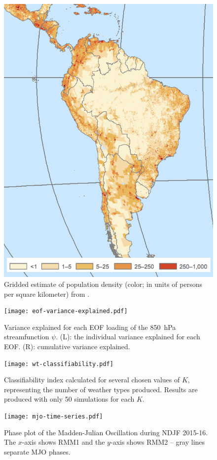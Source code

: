 \documentclass{article}
\begin{document}
\begin{figure}
	\centering
  \includegraphics[width=\textwidth,height=0.6\textheight,keepaspectratio=true]{gpw-v4-2015.png}
	\caption{
		Gridded estimate of population density (color; in units of persons per square kilometer) from \citet{GPWv4}.
	}
\end{figure}

\begin{figure}
  \texttt{[image: eof-variance-explained.pdf]}
	\caption{
		Variance explained for each EOF loading of the \SI{850}{\hecto\pascal} streamfunction $\psi$.
    (L): the individual variance explained for each EOF.
		(R): cumulative variance explained.
	}
\end{figure}

\begin{figure}
  \texttt{[image: wt-classifiability.pdf]}
	\caption{
		Classifiability index \citep[see Methods and][]{Michelangeli1995} calculated for several chosen values of $K$, representing the number of weather types produced.
		Results are produced with only 50 simulations for each $K$.
	}
\end{figure}

\begin{figure}
  \texttt{[image: mjo-time-series.pdf]}
	\caption{
		Phase plot of the Madden-Julian Oscillation during NDJF 2015-16.
		The $x$-axis shows RMM1 and the $y$-axis shows RMM2 -- gray lines separate MJO phases.
	}
	\label{fig:mjo-ts}
\end{figure}

\clearpage


\end{document}
